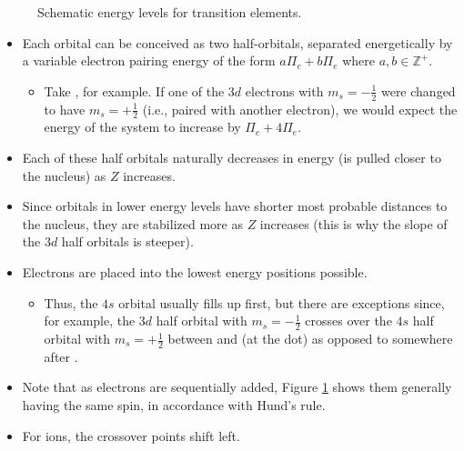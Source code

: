 \documentclass[../notes.tex]{subfiles}
\begin{document}
\begin{itemize}
\begin{figure}[h!]
        \caption{Schematic energy levels for transition elements.}
        \label{fig:transitionEnergyLevels}
    \end{figure}
    \begin{itemize}
        \item Each orbital can be conceived as two half-orbitals, separated energetically by a variable electron pairing energy of the form $a\Pi_c+b\Pi_e$ where $a,b\in\mathbb{Z}^+$.
        \begin{itemize}
            \item Take , for example. If one of the $3d$ electrons with $m_s=-\frac{1}{2}$ were changed to have $m_s=+\frac{1}{2}$ (i.e., paired with another electron), we would expect the energy of the system to increase by $\Pi_c+4\Pi_e$.
        \end{itemize}
        \item Each of these half orbitals naturally decreases in energy (is pulled closer to the nucleus) as $Z$ increases.
        \item Since orbitals in lower energy levels have shorter most probable distances to the nucleus, they are stabilized more as $Z$ increases (this is why the slope of the $3d$ half orbitals is steeper).
        \item Electrons are placed into the lowest energy positions possible.
        \begin{itemize}
            \item Thus, the $4s$ orbital usually fills up first, but there are exceptions since, for example, the $3d$ half orbital with $m_s=-\frac{1}{2}$ crosses over the $4s$ half orbital with $m_s=+\frac{1}{2}$ between  and  (at the dot) as opposed to somewhere after .
        \end{itemize}
        \item Note that as electrons are sequentially added, Figure \ref{fig:transitionEnergyLevels} shows them generally having the same spin, in accordance with Hund's rule.
        \item For ions, the crossover points shift left.
        \begin{itemize}

\end{itemize}
\end{itemize}
\end{itemize}
\end{document}
